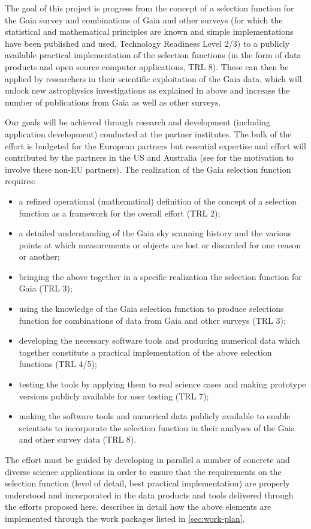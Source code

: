 The goal of this project is progress from the concept of a selection function for the Gaia survey  and combinations of Gaia and other surveys (for which the statistical and mathematical principles are known and simple implementations have been published and used, Technology Readiness Level 2/3) to a publicly available practical implementation of the selection functions (in the form of data products and open source computer applications, TRL 8). These can then be applied by researchers in their scientific exploitation of the Gaia data, which will unlock new astrophysics investigations as explained in  above and increase the number of publications from Gaia as well as other surveys. 

Our goals will be achieved through research and development (including application development) conducted at the {\acro} partner institutes. The bulk of the effort is budgeted for the European partners but essential expertise and effort will contributed by the partners in the US and Australia (see  for the motivation to involve these non-EU partners). The realization of the Gaia selection function requires: 
\begin{itemize}
    \item a refined operational (mathematical) definition of the concept of a selection function as a framework for the overall effort (TRL 2);
    \item a detailed understanding of the Gaia sky scanning history and the various points at which measurements or objects are lost or discarded for one reason or another;
    \item bringing the above together in a specific realization the selection function for Gaia (TRL 3);
    \item using the knowledge of the Gaia selection function to produce selections function for combinations of data from Gaia and other surveys (TRL 3);
    \item developing the necessary software tools and producing numerical data which together constitute a practical implementation of the above selection functions (TRL 4/5);
    \item testing the tools by applying them to real science cases and making prototype versions publicly available for user testing (TRL 7);
    \item making the software tools and numerical data publicly available to enable scientists to incorporate the selection function in their analyses of the Gaia and other survey data (TRL 8).
\end{itemize}
The {\acro} effort must be guided by developing in parallel a number of concrete and diverse science applications in order to ensure that the requirements on the selection function (level of detail, best practical implementation) are properly understood and incorporated in the data products and tools delivered through the efforts proposed here.  describes in detail how the above elements are implemented through the work packages listed in \ref{sec:work-plan}.


